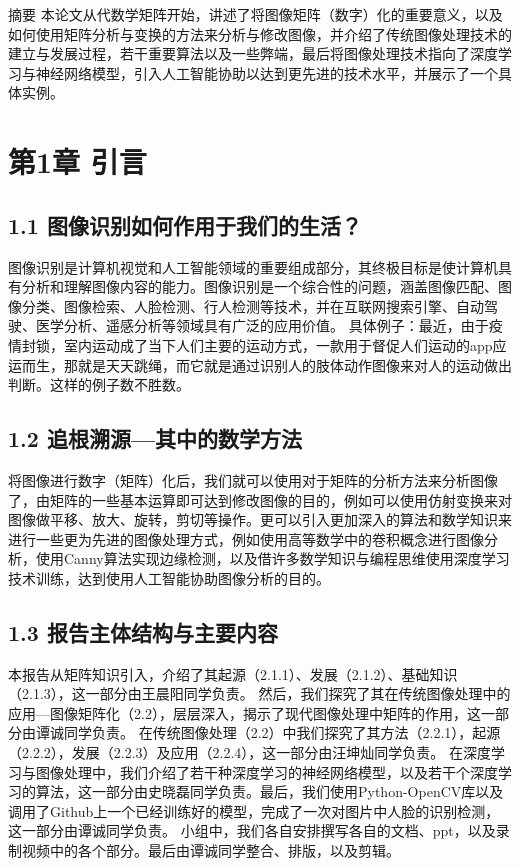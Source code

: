摘要
本论文从代数学矩阵开始，讲述了将图像矩阵（数字）化的重要意义，以及如何使用矩阵分析与变换的方法来分析与修改图像，并介绍了传统图像处理技术的建立与发展过程，若干重要算法以及一些弊端，最后将图像处理技术指向了深度学习与神经网络模型，引入人工智能协助以达到更先进的技术水平，并展示了一个具体实例。

\section{第1章  引言}
\subsection{1.1 图像识别如何作用于我们的生活？}

	图像识别是计算机视觉和人工智能领域的重要组成部分，其终极目标是使计算机具有分析和理解图像内容的能力。图像识别是一个综合性的问题，涵盖图像匹配、图像分类、图像检索、人脸检测、行人检测等技术，并在互联网搜索引擎、自动驾驶、医学分析、遥感分析等领域具有广泛的应用价值。
具体例子：最近，由于疫情封锁，室内运动成了当下人们主要的运动方式，一款用于督促人们运动的app应运而生，那就是天天跳绳，而它就是通过识别人的肢体动作图像来对人的运动做出判断。这样的例子数不胜数。

\subsection{1.2 追根溯源---其中的数学方法}
	将图像进行数字（矩阵）化后，我们就可以使用对于矩阵的分析方法来分析图像了，由矩阵的一些基本运算即可达到修改图像的目的，例如可以使用仿射变换来对图像做平移、放大、旋转，剪切等操作。更可以引入更加深入的算法和数学知识来进行一些更为先进的图像处理方式，例如使用高等数学中的卷积概念进行图像分析，使用Canny算法实现边缘检测，以及借许多数学知识与编程思维使用深度学习技术训练，达到使用人工智能协助图像分析的目的。

\subsection{1.3 报告主体结构与主要内容}
	本报告从矩阵知识引入，介绍了其起源（2.1.1）、发展（2.1.2）、基础知识（2.1.3），这一部分由王晨阳同学负责。
然后，我们探究了其在传统图像处理中的应用---图像矩阵化（2.2），层层深入，揭示了现代图像处理中矩阵的作用，这一部分由谭诚同学负责。
在传统图像处理（2.2）中我们探究了其方法（2.2.1），起源（2.2.2），发展（2.2.3）及应用（2.2.4），这一部分由汪坤灿同学负责。
在深度学习与图像处理中，我们介绍了若干种深度学习的神经网络模型，以及若干个深度学习的算法，这一部分由史晓磊同学负责。最后，我们使用Python-OpenCV库以及调用了Github上一个已经训练好的模型，完成了一次对图片中人脸的识别检测，这一部分由谭诚同学负责。
小组中，我们各自安排撰写各自的文档、ppt，以及录制视频中的各个部分。最后由谭诚同学整合、排版，以及剪辑。
	 
